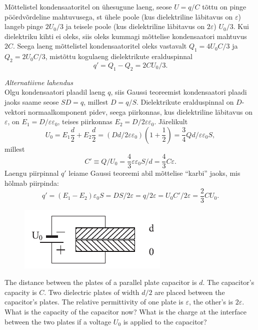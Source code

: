 Mõttelistel kondensaatoritel on ühesugune laeng, seose $U=q/C$ tõttu on pinge pöördvõrdeline mahtuvusega, st ühele poole (kus dielektriline läbitavus on $\varepsilon$) langeb pinge $2U_0/3$ ja teisele poole (kus dielektriline läbitavus on $2\varepsilon$) $U_0/3$. Kui dielektriku kihti ei oleks, siis oleks kummagi mõttelise kondensaatori mahtuvus $2C$. Seega laeng mõttelistel kondensaatoritel oleks vastavalt $Q_1=4U_0C/3$ ja $Q_2=2U_0C/3$, mistõttu kogulaeng dielektrikute eralduspinnal
\[
q'=Q_1-Q_2=2CU_0/3.
\]
\vspace{0.5\baselineskip}

\emph{Alternatiivne lahendus}\\
Olgu kondensaatori plaadil laeng $q$, siis Gaussi teoreemist kondensaatori plaadi jaoks saame seose $SD=q$, millest $D=q/S$. Dielektrikute eralduspinnal on $D$-vektori normaalkomponent pidev, seega piirkonnas, kus dielektriline läbitavus on $\varepsilon$, on $E_1=D/\varepsilon\varepsilon_0$, teises piirkonnas $E_2=D/2\varepsilon\varepsilon_0$. Järelikult
\[
U_0=E_1\frac d2+E_2\frac d2=(Dd/2\varepsilon\varepsilon_0)(1+\frac 12)=\frac 34Qd/\varepsilon\varepsilon_0S,
\]
millest
\[
C'\equiv Q/U_0=\frac 43\varepsilon\varepsilon_0S/d=\frac 43C\varepsilon.
\]
Laengu piirpinnal $q'$ leiame Gaussi teoreemi abil mõttelise \enquote{karbi} jaoks, mis hõlmab piirpinda: 
\[
q'=(E_1-E_2)\varepsilon_0S=DS/2\varepsilon=q/2\varepsilon=U_0C'/2\varepsilon=\frac 23CU_0.
\]

\begin{figure}
	\vspace{-13pt}
	\includegraphics[width=\linewidth]{2017-lahg-07-res-cap2}
\end{figure}
The distance between the plates of a parallel plate capacitor is $d$. The capacitor’s capacity is $C$. Two dielectric plates of width $d/2$ are placed between the capacitor’s plates. The relative permittivity of one plate is $\varepsilon$, the other’s is $2\varepsilon$. What is the capacity of the capacitor now? What is the charge at the interface between the two plates if a voltage $U_0$ is applied to the capacitor?

